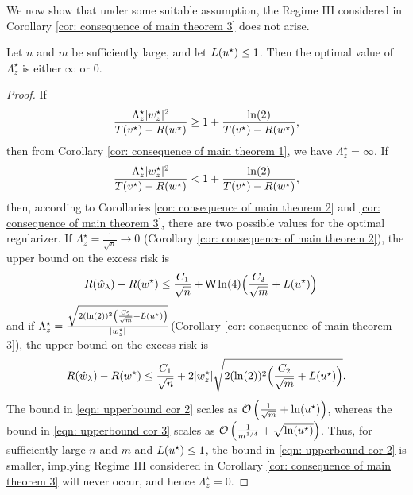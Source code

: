 We now show that under some suitable assumption, the Regime III considered in Corollary \ref{cor: consequence of main theorem 3} does not arise.

\begin{corollary}
Let $n$ and $m$ be sufficiently large, and let $L(u^\star) \leq 1$. Then the optimal value of $\Lambda^\star_z$ is either $\infty$ or $0$.
\end{corollary}

\begin{proof}
If
\begin{equation*}
    \frac{\Lambda_z^\star|w^\star_z|^2}{T(v^\star) - R(w^\star)} \geq 1+\frac{\ln(2)}{T(v^\star) - R(w^\star)},
\end{equation*}
then from Corollary \ref{cor: consequence of main theorem 1}, we have $\Lambda^\star_z = \infty$.
If
\begin{equation*}
    \frac{\Lambda_z^\star|w^\star_z|^2}{T(v^\star) - R(w^\star)} < 1+\frac{\ln(2)}{T(v^\star) - R(w^\star)},
\end{equation*}
then, according to Corollaries \ref{cor: consequence of main theorem 2} and \ref{cor: consequence of main theorem 3}, there are two possible values for the optimal regularizer.
If $\Lambda^\star_z = \frac{1}{\sqrt{n}} \to 0$ (Corollary \ref{cor: consequence of main theorem 2}), the upper bound on the excess risk is
\begin{equation}\label{eqn: upperbound cor 2}
\begin{aligned}
    R(\hat{w}_\lambda) - R(w^\star) &\leq \frac{C_1}{\sqrt{n}} + \mathsf{W}\ln(4)\Big(\frac{C_2}{\sqrt{m}} + L(u^\star)\Big)
\end{aligned}
\end{equation}
and if $\Lambda_z^\star = \frac{\sqrt{2(\ln(2))^2\left(\frac{C_2}{\sqrt{m}} +L(u^\star)\right)}}{|w^\star_z|}$(Corollary \ref{cor: consequence of main theorem 3}), the upper bound on the excess risk is
\begin{equation}\label{eqn: upperbound cor 3}
    R(\hat{w}_\lambda) - R(w^\star) \leq \frac{C_1}{\sqrt{n}} + 2|w^\star_z|\sqrt{2(\ln(2))^2\Big(\frac{C_2}{\sqrt{m}} +L(u^\star)\Big)}.
\end{equation}
The bound in \eqref{eqn: upperbound cor 2} scales as $\mathcal{O}\left(\frac{1}{\sqrt{m}} + \ln(u^\star)\right)$, whereas the bound in \eqref{eqn: upperbound cor 3} scales as $\mathcal{O}\left(\frac{1}{m^{1/4}} + \sqrt{\ln(u^\star)}\right)$. Thus, for sufficiently large $n$ and $m$ and $L(u^\star) \leq 1$, the bound in \eqref{eqn: upperbound cor 2} is smaller, implying Regime III considered in Corollary \ref{cor: consequence of main theorem 3} will never occur, and hence $\Lambda^\star_z = 0$.



\end{proof}


